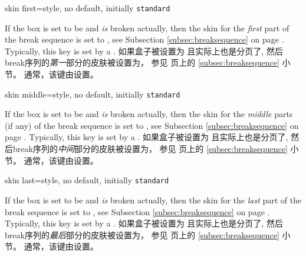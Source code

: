   \begin{docTcbKey}{skin first}{=}{style, no default, initially \texttt{standard}}
\begin{stripedbox}
If the box is set to be  and \emph{is} broken actually,
then the skin for the \emph{first} part of the break sequence
is set to , see Subsection \ref{subsec:breaksequence} on page \pageref{subsec:breaksequence}.
Typically, this key is set by a .
\tcblower
如果盒子被设置为 且实际上也是分页了,%
然后break序列的\emph{第一}部分的皮肤被设置为，
参见 \pageref{subsec:breaksequence} 页上的 \ref{subsec:breaksequence} 小节。
通常，该键由设置。
\end{stripedbox}
\end{docTcbKey}


\begin{docTcbKey}{skin middle}{=}{style, no default, initially \texttt{standard}}
\begin{stripedbox}
If the box is set to be  and \emph{is} broken actually,
then the skin for the \emph{middle} parts (if any) of the break sequence
is set to , see Subsection \ref{subsec:breaksequence} on page \pageref{subsec:breaksequence}.
Typically, this key is set by a .
\tcblower
如果盒子被设置为 且实际上也是分页了,%
然后break序列的\emph{中间}部分的皮肤被设置为，
参见 \pageref{subsec:breaksequence} 页上的 \ref{subsec:breaksequence} 小节。
通常，该键由设置。
\end{stripedbox}
\end{docTcbKey}


\begin{docTcbKey}{skin last}{=}{style, no default, initially \texttt{standard}}
\begin{stripedbox}
If the box is set to be  and \emph{is} broken actually,
then the skin for the \emph{last} part of the break sequence
is set to , see Subsection \ref{subsec:breaksequence} on page \pageref{subsec:breaksequence}.
Typically, this key is set by a .
\tcblower
如果盒子被设置为 且实际上也是分页了,%
然后break序列的\emph{最后}部分的皮肤被设置为，
参见 \pageref{subsec:breaksequence} 页上的 \ref{subsec:breaksequence} 小节。
通常，该键由设置。
\end{stripedbox}
\end{docTcbKey}

